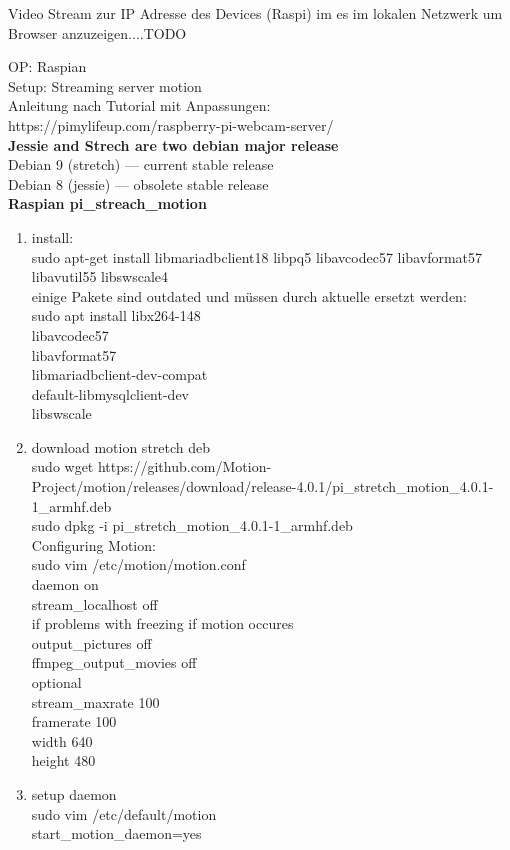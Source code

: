 Video Stream zur IP Adresse des Devices (Raspi) im es im lokalen 
Netzwerk um Browser anzuzeigen....TODO

OP: Raspian\\
Setup: Streaming server motion\\

Anleitung nach Tutorial mit Anpassungen:\\
https://pimylifeup.com/raspberry-pi-webcam-server/\\

\textbf{Jessie and Strech are two debian major release}\\
Debian 9 (stretch) — current stable release\\
Debian 8 (jessie) — obsolete stable release\\

\textbf{Raspian pi\_streach\_motion}

\begin{enumerate}
	\item install:\\
	sudo apt-get install libmariadbclient18 libpq5 libavcodec57  libavformat57 libavutil55 libswscale4\\
	einige Pakete sind outdated und müssen durch aktuelle ersetzt werden:\\
	sudo apt install libx264-148\\
	libavcodec57\\
	libavformat57\\
	libmariadbclient-dev-compat\\
	default-libmysqlclient-dev\\
	libswscale

	\item download motion stretch deb\\
	sudo wget https://github.com/Motion-Project/motion/releases/download/release-4.0.1/pi\_stretch\_motion\_4.0.1-1\_armhf.deb\\
	sudo dpkg -i pi\_stretch\_motion\_4.0.1-1\_armhf.deb\\

	Configuring Motion:\\
	sudo vim /etc/motion/motion.conf\\
	daemon on\\
	stream\_localhost off\\
	if problems with freezing if motion occures\\
	output\_pictures off\\
	ffmpeg\_output\_movies off\\
	optional\\
	stream\_maxrate 100\\
	framerate 100\\
	width 640\\
	height 480

	\item setup daemon\\
	sudo vim /etc/default/motion\\
	start\_motion\_daemon=yes
\end{enumerate}

